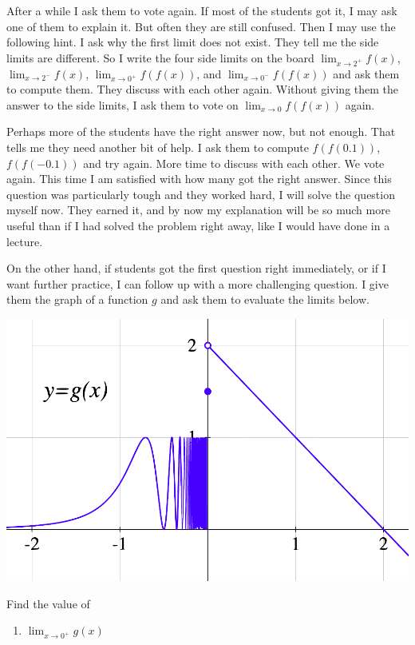 \documentclass[11pt]{article}
\begin{document}
\begin{example}
\begin{comments}
			{\baselineskip After a while I ask them to vote again. If most of the students got it, I may ask one of them to explain it. But often they are still confused. Then I may use the following hint. I ask why the first limit does not exist. They tell me the side limits are different. So I write the four side limits on the board ${\displaystyle \lim_{x \to 2^+} f(x)}$, ${\displaystyle \lim_{x \to 2^-} f(x)}$, ${\displaystyle \lim_{x \to 0^+} f(f(x))}$, and ${\displaystyle \lim_{x \to 0^-} f(f(x))}$ and ask them to compute them. They discuss with each other again. Without giving them the answer to the side limits, I ask them to vote on ${\displaystyle \lim_{x \to 0} f(f(x))}$ again.

			Perhaps more of the students have the right answer now, but not enough. That tells me they need another bit of help. I ask them to compute ${\displaystyle f(f(0.1))}$, ${\displaystyle f(f(-0.1))}$ and try again. More time to discuss with each other. We vote again. This time I am satisfied with how many got the right answer. Since this question was particularly tough and they worked hard, I will solve the question myself now. They earned it, and by now my explanation will be so much more useful than if I had solved the problem right away, like I would have done in a lecture.

			On the other hand, if students got the first question right immediately, or if I want further practice, I can follow up with a more challenging question. I give them the graph of a function $g$ and ask them to evaluate the limits below. }

			\vspace{.5cm}

			\begin{center}
				\hspace{2cm}
				\begin{minipage}{0.6\textwidth}
					\includegraphics[scale=.3]{EX2b}
				\end{minipage}
				\begin{minipage}{0.2\textwidth}
					Find the value of
					\begin{enumerate}
						\item ${\displaystyle \lim_{x \to 0^+} g(x)}$


\end{enumerate}
\end{minipage}
\end{center}
\end{comments}
\end{example}
\end{document}

